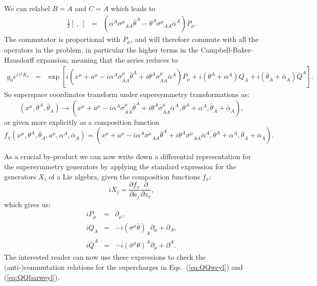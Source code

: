 \documentclass[notes.tex]{subfiles}
\begin{document}
We can relabel $B = A$ and $\dot{C} = \dot{A}$ which leads to 
\begin{eqnarray*}
\frac{1}{2}[~,~]&=&(\alpha^A\sigma^\mu{}_{A\dot{A}}\bar{\theta}^{\dot{A}} -\theta^A\sigma^\mu{}_{A\dot{A}}\bar{\alpha}^{\dot{A}})P_\mu.
\end{eqnarray*}
The commutator is proportional with $P_\mu$, and will therefore commute with all the operators in the problem, in particular the higher terms in the Campbell-Baker-Hausdorff expansion, meaning that the series reduces to
\begin{eqnarray*}
g_0 e^{iz^\pi K_\pi} 
&=& \exp[i(x^\mu + a^\mu - i\alpha^A\sigma^\mu_{A\dot{A}}\bar{\theta}^{\dot{A}} + i\theta^A\sigma^\mu_{A\dot{A}}\bar{\alpha}^{\dot{A}})P_\mu + i(\theta^A+\alpha^A)Q_A + i(\bar{\theta}_{\dot{A}}+\bar{\alpha}_{\dot{A}})\bar{Q}^{\dot{A}}].
\end{eqnarray*}
So superspace coordinates transform under supersymmetry transformations as:
\begin{equation}
(x^\mu, \theta^A, \bar{\theta}_{\dot{A}}) \to  (x^\mu + a^\mu -i\alpha^A\sigma^\mu_{A\dot{A}}\bar{\theta}^{\dot{A}} + i\theta^A\sigma^\mu_{A\dot{A}}\bar{\alpha}^{\dot{A}}, \theta^A + \alpha^A, \bar{\theta}_{\dot{A}} + \bar{\alpha}_{\dot{A}}),
\end{equation}
or given more explicitly as a composition function
\begin{equation}
f_\pi(x^\mu, \theta^A, \bar{\theta}_{\dot{A}},a^\mu, \alpha^A, \bar{\alpha}_{\dot{A}}) =  (x^\mu + a^\mu -i\alpha^A\sigma^\mu{}_{A\dot{A}}\bar{\theta}^{\dot{A}} + i\theta^A\sigma^\mu{}_{A\dot{A}}\bar{\alpha}^{\dot{A}}, \theta^A + \alpha^A, \bar{\theta}_{\dot{A}} + \bar{\alpha}_{\dot{A}}).
\end{equation}

As a crucial by-product we can now write down a differential representation for the supersymmetry generators by applying the standard expression for the generators $X_i$ of a Lie algebra, given the composition functions $f_\pi$:
\[ iX_j = \frac{\partial f_\pi}{\partial a_j}\frac{\partial}{\partial z_\pi},\]
which gives us:
\begin{eqnarray}
iP_\mu &=& \partial_\mu \label{eq:diffrepP},\\
iQ_A &=& -i(\sigma^\mu\bar{\theta})_A\partial_\mu +\partial_A,\\
i\bar{Q}^{\dot{A}} &=& -i(\bar{\sigma}^\mu \theta)^{\dot{A}}\partial_\mu +\partial^{\dot{A}}.
\label{eq:diffrepQbar}
\end{eqnarray}
The interested reader can now use these expressions to check the (anti-)commutation relations for the supercharges in Eqs.~(\ref{eq:QQweyl}) and (\ref{eq:QQbarweyl}).
\end{document}
